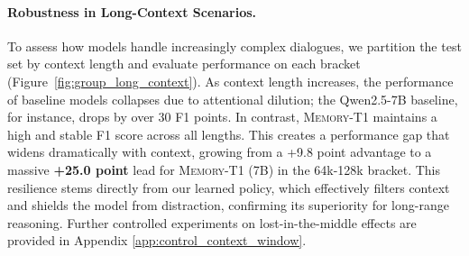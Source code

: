 \documentclass{article} %
\begin{document}
\paragraph{Robustness in Long-Context Scenarios.} To assess how models handle increasingly complex dialogues, we partition the test set by context length and evaluate performance on each bracket (Figure~\ref{fig:group_long_context}). As context length increases, the performance of baseline models collapses due to attentional dilution; the Qwen2.5-7B baseline, for instance, drops by over 30 F1 points. In contrast, \textsc{Memory-T1} maintains a high and stable F1 score across all lengths. This creates a performance gap that widens dramatically with context, growing from a +9.8 point advantage to a massive \textbf{+25.0 point} lead for \textsc{Memory-T1} (7B) in the 64k-128k bracket. This resilience stems directly from our learned policy, which effectively filters context and shields the model from distraction, confirming its superiority for long-range reasoning. Further controlled experiments on lost-in-the-middle effects are provided in Appendix \ref{app:control_context_window}.


\begin{table}[t!]
\footnotesize 
\setlength{\tabcolsep}{5pt}
\centering
\caption{Robustness of Memory-T1 under increasing time label noise.}
\label{tab:performance_sparsity}
    \label{tab:noise_analysis}
\end{table}
\end{document}
